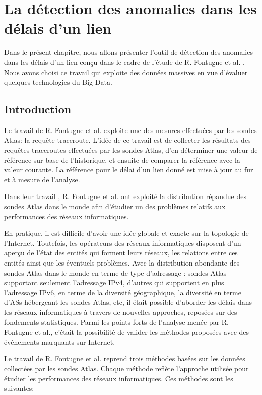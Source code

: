 \chapter{La détection des anomalies dans les délais d'un lien}

Dans le présent chapitre, nous allons présenter l'outil de détection des anomalies dans les délais d'un lien  conçu dans le cadre de l'étude  de R. Fontugne et al. \cite{DBLP:journals/corr/FontugneAPB16}. Nous avons choisi ce travail qui exploite des données massives en vue d'évaluer quelques technologies du Big Data.

\section{Introduction}
Le travail de R. Fontugne \cite{DBLP:journals/corr/FontugneAPB16} et al. exploite une des mesures effectuées par les sondes Atlas: la requête traceroute. L'idée de ce travail est de collecter les résultats des requêtes traceroutes effectuées par les sondes Atlas, d'en déterminer une valeur de référence sur base de l'historique, et ensuite de comparer la référence avec la valeur courante. La référence pour le délai  d'un lien donné   est mise à jour au fur et à mesure de l'analyse.



Dans leur travail \cite{DBLP:journals/corr/FontugneAPB16},  R. Fontugne et al. ont exploité la  distribution répandue des sondes Atlas dans le monde afin d'étudier un des problèmes relatifs aux performances des réseaux informatiques. 

En pratique, il est  difficile  d'avoir une idée globale et exacte sur la topologie de l'Internet. Toutefois, les opérateurs des réseaux informatiques  disposent d'un aperçu de l'état des entités qui forment leurs réseaux, les relations entre ces entités ainsi que les éventuels problèmes. Avec la distribution abondante des sondes Atlas dans le monde en terme de type d'adressage : sondes Atlas supportant seulement l'adressage IPv4, d'autres qui supportent en plus l'adressage IPv6, en terme de  la diversité géographique, la diversité en terme d'ASs hébergeant les sondes Atlas, etc, il était  possible d'aborder  les délais dans les réseaux informatiques à travers de nouvelles approches, reposées sur des fondements statistiques. Parmi les points forts de l'analyse menée par R. Fontugne et al., c'était la possibilité de valider les   méthodes proposées avec des événements  marquants sur Internet.

Le travail de R. Fontugne et al. reprend trois méthodes basées sur les données collectées par les sondes Atlas. Chaque méthode reflète l'approche utilisée pour étudier les performances des réseaux informatiques. Ces méthodes sont les suivantes:

